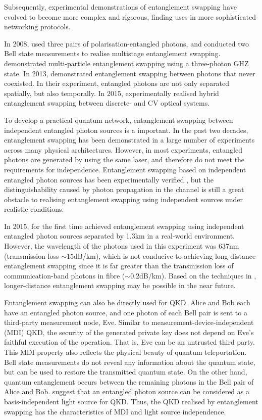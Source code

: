 Subsequently, experimental demonstrations of entanglement swapping have evolved to become more complex and rigorous, finding uses in more sophisticated networking protocols.

In 2008, \cite{bib:goebel08} used three pairs of polarisation-entangled photons, and conducted two Bell state measurements to realise multistage entanglement swapping. \cite{bib:PRL_103_020501} demonstrated multi-particle entanglement swapping using a three-photon GHZ state. In 2013, \cite{bib:PRL_110_210403} demonstrated entanglement swapping between photons that never coexisted. In their experiment, entangled photons are not only separated spatially, but also temporally. In 2015, \cite{bib:PRL_114_100501} experimentally realised hybrid entanglement swapping between discrete- and CV optical systems.

To develop a practical quantum network, entanglement swapping between independent entangled photon sources is a important. In the past two decades, entanglement swapping has been demonstrated in a large number of experiments across many physical architectures. However, in most experiments, entangled photons are generated by using the same laser, and therefore do not meet the requirements for independence. Entanglement swapping based on independent entangled photon sources has been experimentally verified \cite{bib:PRL_96_110501, bib:Nat_Phys_3_692, bib:PRA_79_040302}, but the distinguishability caused by photon propagation in the channel is still a great obstacle to realising entanglement swapping using independent sources under realistic conditions.

In 2015, \cite{bib:Nat_526_682} for the first time achieved entanglement swapping using independent entangled photon sources separated by 1.3km in a real-world environment. However, the wavelength of the photons used in this experiment was 637nm (transmission loss \mbox{$\sim 15$dB/km}), which is not conducive to achieving long-distance entanglement swapping since it is far greater than the transmission loss of communication-band photons in fibre (\mbox{$\sim 0.2$dB/km}). Based on the techniques in \cite{bib:sun2016quantum, bib:Nat_phot_10_676}, longer-distance entanglement swapping may be possible in the near future.

Entanglement swapping can also be directly used for QKD. Alice and Bob each have an entangled photon source, and one photon of each Bell pair is sent to a third-party measurement node, Eve. Similar to measurement-device-independent (MDI) QKD, the security of the generated private key does not depend on Eve's faithful execution of the operation. That is, Eve can be an untrusted third party. This MDI property also reflects the physical beauty of quantum teleportation. Bell state measurements do not reveal any information about the quantum state, but can be used to restore the transmitted quantum state. On the other hand, quantum entanglement occurs between the remaining photons in the Bell pair of Alice and Bob. \cite{bib:PRL_90_057902, bib:NJP_10_2008} suggest that an entangled photon source can be considered as a basis-independent light source for QKD. Thus, the QKD realised by entanglement swapping has the characteristics of MDI and light source independence.

